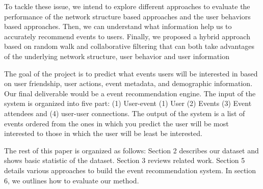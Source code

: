 \documentclass{article}
\begin{document}
To tackle these issue, we intend to explore different approaches to evaluate the performance of the network structure based approaches and the user behaviors based approaches. Then, we can understand what information help us to accurately recommend events to users. Finally, we proposed a hybrid approach based on random walk and collaborative filtering that can both take advantages of the underlying network structure, user behavior and user information

The goal of the project is to predict what events users will be interested in based on user friendship, user actions, event metadata, and demographic information. Our final deliverable would be a event recommendation engine. The input of the system is organized into five part: (1) User-event (1) User (2) Events (3) Event attendees and (4) user-user connections. The output of the system is a list of events ordered from the ones in which you predict the user will be most interested to those in which the user will be least be interested.

The rest of this paper is organized as follows: Section 2 describes our dataset and shows basic statistic of the dataset. Section 3 reviews related work. Section 5 details various approaches to build the event recommendation system. In section 6, we outlines how to evaluate our method.



\end{document}
